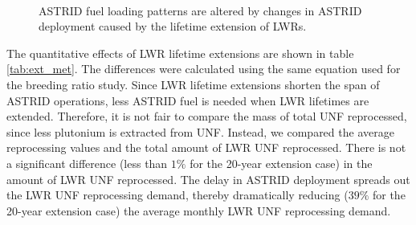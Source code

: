 \begin{figure}[!ht]
	\centering
	\quad
	\\
	\quad
	\caption{\gls{ASTRID} fuel loading patterns are altered by changes in \gls{ASTRID} deployment
			 caused by the lifetime extension of \glspl{LWR}.}
	\label{fig:ext_fuel}
\end{figure}

The quantitative effects of
\gls{LWR} lifetime extensions are shown in table \ref{tab:ext_met}.
The differences were calculated using the same equation used for the
breeding ratio study. 
Since \gls{LWR} lifetime extensions shorten the span of \gls{ASTRID} operations, less \gls{ASTRID} fuel is needed when \gls{LWR} lifetimes are extended.
Therefore, it is not fair to compare the mass of total \gls{UNF} reprocessed,
since less plutonium is extracted from \gls{UNF}. Instead, we compared the
average reprocessing values and the total amount of \gls{LWR} \gls{UNF} reprocessed.
There is not a significant difference (less than $1\%$ for the 20-year extension case)
in the amount of \gls{LWR}
\gls{UNF} reprocessed. The delay in \gls{ASTRID} deployment
spreads out the \gls{LWR} \gls{UNF} reprocessing demand,
thereby dramatically reducing ($39\%$ for the 20-year extension case)
the average monthly \gls{LWR} \gls{UNF} reprocessing demand.

